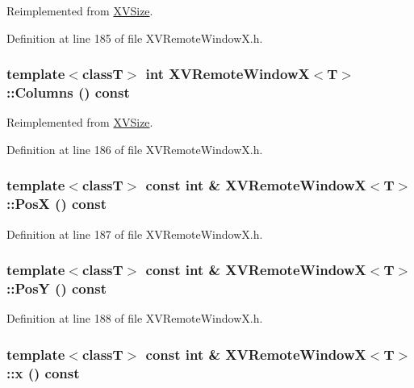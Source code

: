 Reimplemented from \hyperlink{class_XVSize}{XVSize}.

Definition at line 185 of file XVRemote\-Window\-X.h.\label{XVRemoteWindowX_a35}
\hypertarget{class_XVRemoteWindowX_a35}{
\subsubsection[Columns]{\setlength{\rightskip}{0pt plus 5cm}template$<$classT$>$ int XVRemote\-Window\-X$<$T$>$::Columns () const}}




Reimplemented from \hyperlink{class_XVSize}{XVSize}.

Definition at line 186 of file XVRemote\-Window\-X.h.\label{XVRemoteWindowX_a36}
\hypertarget{class_XVRemoteWindowX_a36}{
\subsubsection[PosX]{\setlength{\rightskip}{0pt plus 5cm}template$<$classT$>$ const int \& XVRemote\-Window\-X$<$T$>$::Pos\-X () const}}




Definition at line 187 of file XVRemote\-Window\-X.h.\label{XVRemoteWindowX_a37}
\hypertarget{class_XVRemoteWindowX_a37}{
\subsubsection[PosY]{\setlength{\rightskip}{0pt plus 5cm}template$<$classT$>$ const int \& XVRemote\-Window\-X$<$T$>$::Pos\-Y () const}}




Definition at line 188 of file XVRemote\-Window\-X.h.\label{XVRemoteWindowX_a38}
\hypertarget{class_XVRemoteWindowX_a38}{
\subsubsection[x]{\setlength{\rightskip}{0pt plus 5cm}template$<$classT$>$ const int \& XVRemote\-Window\-X$<$T$>$::x () const}}




